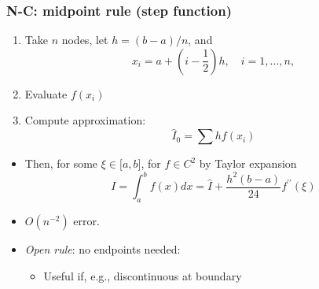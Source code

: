 \documentclass[bigger,handout]{beamer}
\begin{document}
\begin{frame}%

\frametitle{N-C: midpoint rule (step function)}

\begin{enumerate}
\item Take $n$ nodes, let $h=\left( b-a\right) /n$, and 
\begin{equation*}
x_{i}=a+(i-\frac{1}{2})h,\quad i=1,\ldots ,n,
\end{equation*}

\item Evaluate $f(x_{i})$

\item Compute approximation:%
\begin{equation*}
\hat{I}_{0}=\sum hf(x_{i})
\end{equation*}
\end{enumerate}

\begin{itemize}
\item Then, for some $\xi \in \lbrack a,b]$, for $f\in C^2$ by Taylor expansion
\begin{equation*}
I=\int_{a}^{b}f(x)dx=\hat{I}+\frac{h^{2}(b-a)}{24}f^{\prime \prime }(\xi )
\end{equation*}
\item $O(n^{-2})$ error.
\item \emph{Open rule}: no endpoints needed: 
\begin{itemize}
\item Useful if, e.g., discontinuous at boundary
\end{itemize}

\end{itemize}


\end{frame}%
\end{document}
